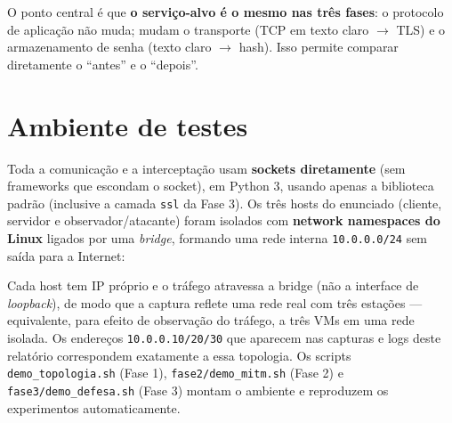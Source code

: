 \documentclass[11pt,a4paper]{article}
\newcommand{\seta}{\texorpdfstring{$\rightarrow$}{->}}
\begin{document}
O ponto central é que \textbf{o serviço-alvo é o mesmo nas três fases}: o
protocolo de aplicação não muda; mudam o transporte (TCP em texto claro
\seta{} TLS) e o armazenamento de senha (texto claro \seta{} hash). Isso permite
comparar diretamente o ``antes'' e o ``depois''.

\section{Ambiente de testes}
\label{sec:ambiente}

Toda a comunicação e a interceptação usam \textbf{sockets diretamente} (sem
frameworks que escondam o socket), em Python 3, usando apenas a biblioteca
padrão (inclusive a camada \texttt{ssl} da Fase 3). Os três hosts do enunciado
(cliente, servidor e observador/atacante) foram isolados com \textbf{network
namespaces do Linux} ligados por uma \textit{bridge}, formando uma rede interna
\texttt{10.0.0.0/24} sem saída para a Internet:

\begin{center}
\end{center}

Cada host tem IP próprio e o tráfego atravessa a bridge (não a interface de
\textit{loopback}), de modo que a captura reflete uma rede real com três
estações — equivalente, para efeito de observação do tráfego, a três VMs em uma
rede isolada. Os endereços \texttt{10.0.0.10/20/30} que aparecem nas capturas e
logs deste relatório correspondem exatamente a essa topologia. Os scripts
\texttt{demo\_topologia.sh} (Fase 1), \texttt{fase2/demo\_mitm.sh} (Fase 2) e
\texttt{fase3/demo\_defesa.sh} (Fase 3) montam o ambiente e reproduzem os
experimentos automaticamente.
\end{document}
